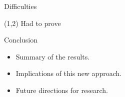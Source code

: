 \documentclass{beamer}
\begin{document}
\begin{frame}{Difficulties}
  \begin{textblock}{10}(1,2)
    Had to prove
  \end{textblock}
\end{frame}

\begin{frame}{Conclusion}
    \begin{itemize}
        \item Summary of the results.
        \item Implications of this new approach.
        \item Future directions for research.
    \end{itemize}
\end{frame}
\end{document}
